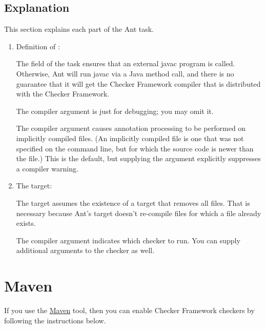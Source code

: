 \subsection{Explanation\label{ant-task-explanation}}

This section explains each part of the Ant task.

\begin{enumerate}
\item Definition of :

The  field of the  task
ensures that an external javac program is called.  Otherwise, Ant will run
javac via a Java method call, and there is no guarantee that it will get
the Checker Framework compiler that is distributed with the Checker Framework.

The  compiler argument is just for debugging; you may omit
it.

The  compiler argument causes annotation processing
to be performed on implicitly compiled files.  (An implicitly compiled file
is one that was not specified on the command line, but for which the source
code is newer than the  file.)  This is the default, but
supplying the argument explicitly suppresses a compiler warning.


\item The  target:

The target assumes the existence of a  target that removes all
 files.  That is necessary because Ant's  target
doesn't re-compile  files for which a  file
already exists.

The  compiler argument indicates which checker to
run.  You can supply additional arguments to the checker as well.

\end{enumerate}


\section{Maven\label{maven}}

If you use the \href{http://maven.apache.org/}{Maven} tool,
then you can enable Checker Framework checkers by following the
instructions below.

